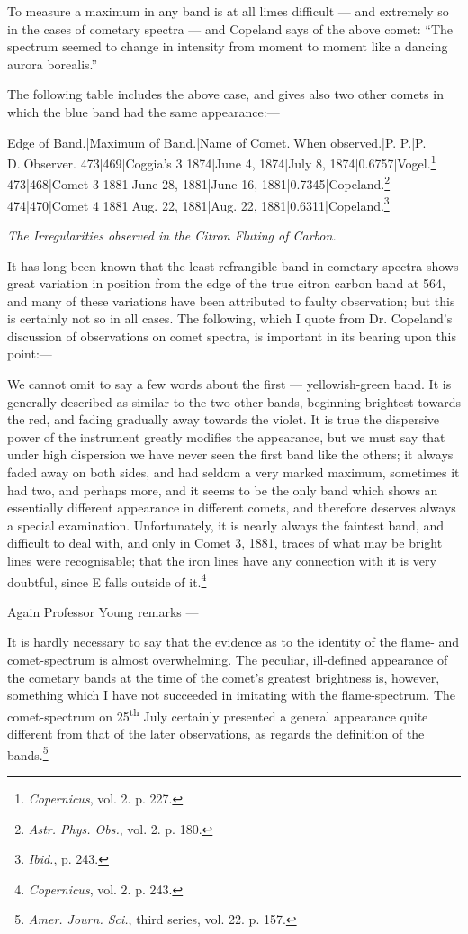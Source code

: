 \documentclass[a4paper, 12pt, oneside, polutonikogreek, english]{article}
\begin{document}
To measure a maximum in any band is at all limes difficult --- and extremely so in the cases of cometary spectra --- and Copeland says of the above comet: ``The spectrum seemed to change in intensity from moment to moment like a dancing aurora borealis.''

The following table includes the above case, and gives also two other comets in which the blue band had the same appearance:---

Edge of Band.|Maximum of Band.|Name of Comet.|When observed.|P. P.|P. D.|Observer. 
473|469|Coggia's 3 1874|June 4, 1874|July 8, 1874|0.6757|Vogel.\footnote{\emph{Copernicus}, vol. 2. p. 227.} 
473|468|Comet 3 1881|June 28, 1881|June 16, 1881|0.7345|Copeland.\footnote{\emph{Astr. Phys. Obs.}, vol. 2. p. 180.} 
474|470|Comet 4 1881|Aug. 22, 1881|Aug. 22, 1881|0.6311|Copeland.\footnote{\emph{Ibid.}, p. 243.} 

\emph{The Irregularities observed in the Citron Fluting of Carbon.}

It has long been known that the least refrangible band in cometary spectra shows great variation in position from the edge of the true citron carbon band at 564, and many of these variations have been attributed to faulty observation; but this is certainly not so in all cases. The following, which I quote from Dr. Copeland's discussion of observations on comet spectra, is important in its bearing upon this point:---

We cannot omit to say a few words about the first --- yellowish-green band. It is generally described as similar to the two other bands, beginning brightest towards the red, and fading gradually away towards the violet. It is true the dispersive power of the instrument greatly modifies the appearance, but we must say that under high dispersion we have never seen the first band like the others; it always faded away on both sides, and had seldom a very marked maximum, sometimes it had two, and perhaps more, and it seems to be the only band which shows an essentially different appearance in different comets, and therefore deserves always a special examination. Unfortunately, it is nearly always the faintest band, and difficult to deal with, and only in Comet 3, 1881, traces of what may be bright lines were recognisable; that the iron lines have any connection with it is very doubtful, since E falls outside of it.\footnote{\emph{Copernicus}, vol. 2. p. 243.}

Again Professor Young remarks ---

It is hardly necessary to say that the evidence as to the identity of the flame- and comet-spectrum is almost overwhelming. The peculiar, ill-defined appearance of the cometary bands at the time of the comet's greatest brightness is, however, something which I have not succeeded in imitating with the flame-spectrum. The comet-spectrum on 25\textsuperscript{th} July certainly presented a general appearance quite different from that of the later observations, as regards the definition of the bands.\footnote{\emph{Amer. Journ. Sci.}, third series, vol. 22. p. 157.}
\end{document}
